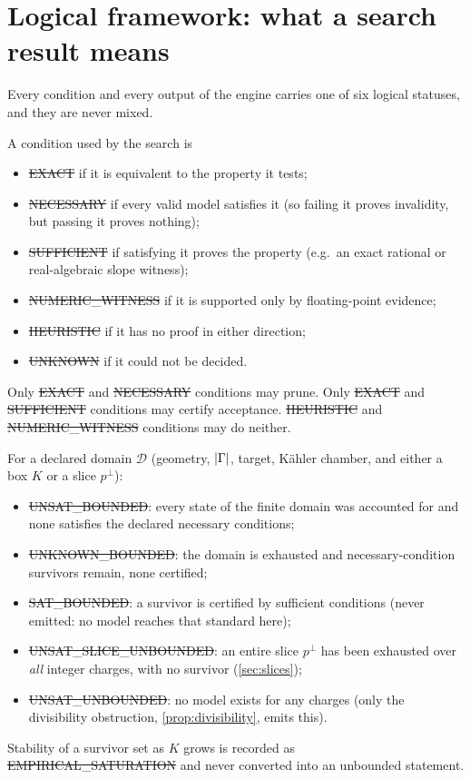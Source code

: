\section{Logical framework: what a search result means}
\label{sec:framework}

Every condition and every output of the engine carries one of six logical
statuses, and they are never mixed.

\begin{definition}
A condition used by the search is
\begin{itemize}[leftmargin=*]
\item \st{EXACT} if it is equivalent to the property it tests;
\item \st{NECESSARY} if every valid model satisfies it (so failing it proves
  invalidity, but passing it proves nothing);
\item \st{SUFFICIENT} if satisfying it proves the property (e.g.\ an exact
  rational or real-algebraic slope witness);
\item \st{NUMERIC\_WITNESS} if it is supported only by floating-point evidence;
\item \st{HEURISTIC} if it has no proof in either direction;
\item \st{UNKNOWN} if it could not be decided.
\end{itemize}
Only \st{EXACT} and \st{NECESSARY} conditions may prune. Only \st{EXACT} and
\st{SUFFICIENT} conditions may certify acceptance. \st{HEURISTIC} and
\st{NUMERIC\_WITNESS} conditions may do neither.
\end{definition}

\begin{definition}
For a declared domain $\mathcal D$ (geometry, $|\Gamma|$, target, Kähler chamber,
and either a box $K$ or a slice $p^\perp$):
\begin{itemize}[leftmargin=*]
\item \st{UNSAT\_BOUNDED}: every state of the finite domain was accounted for and
  none satisfies the declared necessary conditions;
\item \st{UNKNOWN\_BOUNDED}: the domain is exhausted and necessary-condition
  survivors remain, none certified;
\item \st{SAT\_BOUNDED}: a survivor is certified by sufficient conditions
  (never emitted: no model reaches that standard here);
\item \st{UNSAT\_SLICE\_UNBOUNDED}: an entire slice $p^\perp$ has been exhausted
  over \emph{all} integer charges, with no survivor (\cref{sec:slices});
\item \st{UNSAT\_UNBOUNDED}: no model exists for any charges (only the
  divisibility obstruction, \cref{prop:divisibility}, emits this).
\end{itemize}
Stability of a survivor set as $K$ grows is recorded as
\st{EMPIRICAL\_SATURATION} and never converted into an unbounded statement.
\end{definition}

